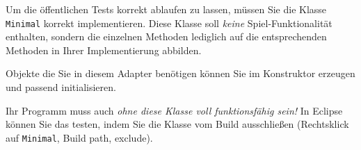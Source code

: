 
Um die \"offentlichen Tests korrekt ablaufen zu lassen, m\"ussen Sie die Klasse 
\texttt{\testAdapter{}Minimal} korrekt implementieren. Diese Klasse soll \emph{keine} Spiel-Funktionalit\"at enthalten, sondern die einzelnen Methoden lediglich auf die entsprechenden Methoden in Ihrer Implementierung abbilden.

Objekte die Sie in diesem Adapter ben\"otigen k\"onnen Sie im Konstruktor erzeugen und \glqq{}passend\grqq{} initialisieren.



Ihr Programm muss auch \emph{ohne diese Klasse voll funktionsf\"ahig
sein!} In Eclipse k\"onnen Sie das testen, indem Sie die Klasse vom
Build ausschlie\ss{}en (Rechtsklick auf \texttt{\testAdapter{}Mini\-mal}, 
Build path, exclude).

